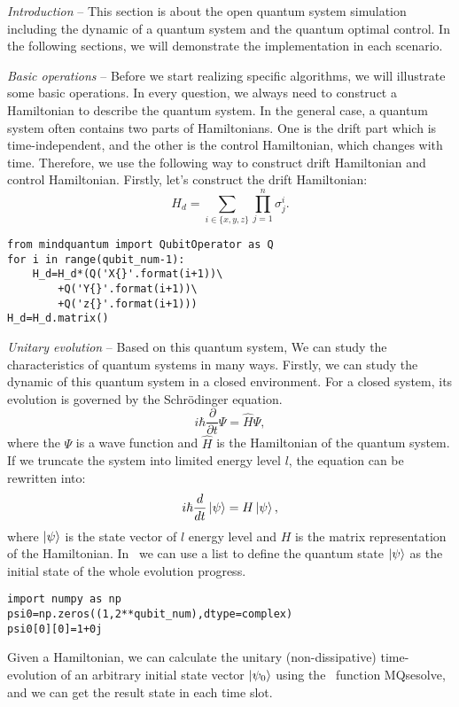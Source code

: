 \textit{Introduction} -- This section is about the open quantum system simulation including the dynamic of a quantum system and the quantum optimal control. In the following sections, we will demonstrate the implementation in each scenario.

\textit{Basic operations} -- Before we start realizing specific algorithms, we will illustrate some basic operations. In every question, we always need to construct a Hamiltonian to describe the quantum system. In the general case, a quantum system often contains two parts of Hamiltonians. One is the drift part which is time-independent, and the other is the control Hamiltonian, which changes with time. Therefore, we use the following way to construct drift Hamiltonian and control Hamiltonian. Firstly, let's construct the drift Hamiltonian:
\begin{equation}
    H_{d}=\sum_{i\in\{x,y,z\}}\prod_{j=1}^{n}\sigma_{j}^{i}.
\end{equation}
\begin{lstlisting}
from mindquantum import QubitOperator as Q
for i in range(qubit_num-1):
    H_d=H_d*(Q('X{}'.format(i+1))\
        +Q('Y{}'.format(i+1))\
        +Q('z{}'.format(i+1)))
H_d=H_d.matrix()
\end{lstlisting}
\textit{Unitary evolution} -- Based on this quantum system, We can study the characteristics of quantum systems in many ways. Firstly, we can study the dynamic of this quantum system in a closed environment. For a closed system, its evolution is governed by the Schrödinger equation.
\begin{equation}
    i\hbar\frac{\partial}{\partial t}\Psi=\hat{H}\Psi,
\end{equation}
where the $\Psi$ is a wave function and $\hat{H}$ is the Hamiltonian of the quantum system. If we truncate the system into limited energy level $l$, the equation can be rewritten into:
\begin{equation}
    i\hbar\frac{d}{dt}\ket{\psi}=H\ket{\psi},
    \label{shro}
\end{equation}
where $\ket{\psi}$ is the state vector of $l$ energy level and $H$ is the matrix representation of the Hamiltonian. In \MindQuantum\ we can use a list to define the quantum state $\ket{\psi}$ as the initial state of the whole evolution progress.
\begin{lstlisting}
import numpy as np
psi0=np.zeros((1,2**qubit_num),dtype=complex)
psi0[0][0]=1+0j
\end{lstlisting}
Given a Hamiltonian, we can calculate the unitary (non-dissipative) time-evolution of an arbitrary initial state vector $\ket{\psi_{0}}$ using the \MindQuantum\ function MQsesolve, and we can get the result state in each time slot.
